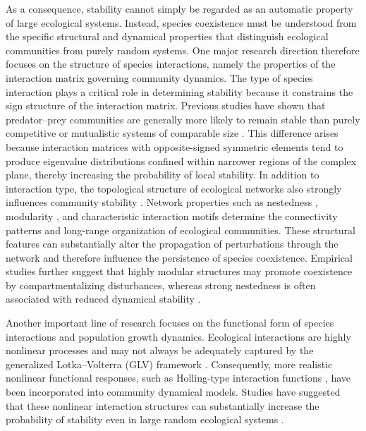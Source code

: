 As a consequence, stability cannot simply be regarded as an automatic property of large ecological systems. Instead, species coexistence must be understood from the specific structural and dynamical properties that distinguish ecological communities from purely random systems. One major research direction therefore focuses on the structure of species interactions, namely the properties of the interaction matrix governing community dynamics. The type of species interaction plays a critical role in determining stability because it constrains the sign structure of the interaction matrix. Previous studies have shown that predator--prey communities are generally more likely to remain stable than purely competitive or mutualistic systems of comparable size \citep{allesina_stability_2012}. This difference arises because interaction matrices with opposite-signed symmetric elements tend to produce eigenvalue distributions confined within narrower regions of the complex plane, thereby increasing the probability of local stability. In addition to interaction type, the topological structure of ecological networks also strongly influences community stability \citep{bascompte_plant-animal_2007, spiesman_habitat_2013,grass_past_2018}. Network properties such as nestedness \citep{bascompte_nested_2003, mariani_nestedness_2019}, modularity \citep{thebault_stability_2010,sales-pardo_importance_2017}, and characteristic interaction motifs \citep{klaise_origin_2017} determine the connectivity patterns and long-range organization of ecological communities\citep{letten_mechanistic_2019}. These structural features can substantially alter the propagation of perturbations through the network and therefore influence the persistence of species coexistence. Empirical studies further suggest that highly modular structures may promote coexistence by compartmentalizing disturbances, whereas strong nestedness is often associated with reduced dynamical stability \citep{bascompte_plant-animal_2007, thebault_stability_2010}.

Another important line of research focuses on the functional form of species interactions and population growth dynamics. Ecological interactions are highly nonlinear processes and may not always be adequately captured by the generalized Lotka--Volterra (GLV) framework \citep{case_illustrated_2000, allesina_stability_2012, barabas_chessons_2018}. Consequently, more realistic nonlinear functional responses, such as Holling-type interaction functions \citep{holling_characteristics_1959}, have been incorporated into community dynamical models. Studies have suggested that these nonlinear interaction structures can substantially increase the probability of stability even in large random ecological systems \citep{rohr_structural_2014, hatton_diversity_2024}.

